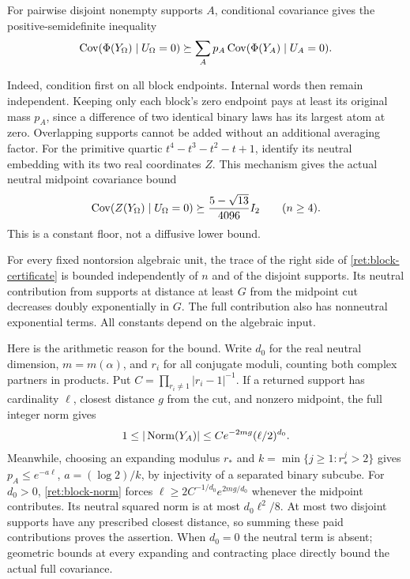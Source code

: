 \begin{proposition}\label{ret:block-lower}
For pairwise disjoint nonempty supports $A$, conditional covariance gives the positive-semidefinite inequality
\begin{equation}\label{ret:block-certificate}
 \operatorname{Cov}(\Phi(Y_\Omega)\mid U_\Omega=0)
 \succeq\sum_Ap_A\operatorname{Cov}(\Phi(Y_A)\mid U_A=0).
\end{equation}
\end{proposition}
Indeed, condition first on all block endpoints.
Internal words then remain independent.
Keeping only each block's zero endpoint pays at least its original mass $p_A$, since a difference of two identical binary laws has its largest atom at zero.
Overlapping supports cannot be added without an additional averaging factor.
For the primitive quartic $t^4-t^3-t^2-t+1$, identify its neutral embedding with its two real coordinates $Z$.
This mechanism gives the actual neutral midpoint covariance bound
\[
 \operatorname{Cov}(Z(Y_\Omega)\mid U_\Omega=0)
       \succeq\frac{5-\sqrt{13}}{4096}I_2\qquad(n\ge4).
\]
This is a constant floor, not a diffusive lower bound.

\begin{proposition}\label{ret:bounded-certificate}
For every fixed nontorsion algebraic unit, the trace of the right side of \eqref{ret:block-certificate} is bounded independently of $n$ and of the disjoint supports.
Its neutral contribution from supports at distance at least $G$ from the midpoint cut decreases doubly exponentially in $G$.
The full contribution also has nonneutral exponential terms.
All constants depend on the algebraic input.
\end{proposition}

Here is the arithmetic reason for the bound.
Write $d_0$ for the real neutral dimension, $m=m(\alpha)$, and $r_i$ for all conjugate moduli, counting both complex partners in products.
Put $C=\prod_{r_i\ne1}|r_i-1|^{-1}$.
If a returned support has cardinality $\ell$, closest distance $g$ from the cut, and nonzero midpoint, the full integer norm gives
\begin{equation}\label{ret:block-norm}
 1\le|\operatorname{Norm}(Y_A)|\le Ce^{-2mg}(\ell/2)^{d_0}.
\end{equation}
Meanwhile, choosing an expanding modulus $r_*$ and $k=\min\{j\ge1:r_*^j>2\}$ gives $p_A\le e^{-a\ell}$, $a=(\log2)/k$, by injectivity of a separated binary subcube.
For $d_0>0$, \eqref{ret:block-norm} forces $\ell\ge2C^{-1/d_0}e^{2mg/d_0}$ whenever the midpoint contributes.
Its neutral squared norm is at most $d_0\ell^2/8$.
At most two disjoint supports have any prescribed closest distance, so summing these paid contributions proves the assertion.
When $d_0=0$ the neutral term is absent; geometric bounds at every expanding and contracting place directly bound the actual full covariance.

